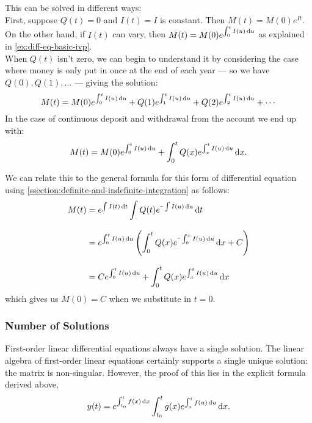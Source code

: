 \documentclass[../MathsNotesBase.tex]{subfiles}
\begin{document}
{\begin{exe}
{				This can be solved in different ways:\\
				
				First, suppose $Q(t)=0$ and $I(t)=I$ is constant. Then ${ M(t)=M(0) e^{I t} }$.\\
				
				On the other hand, if $I(t)$ can vary, then ${ M(t) = M(0) e^{\int_{0}^{t} I(u) \dif u} }$ as explained in \ref{ex:diff-eq-basic-ivp}.\\
				
				When $Q(t)$ isn't zero, we can begin to understand it by considering the case where money is only put in once at the end of each year --- so we have ${ Q(0), Q(1), \dots }$ --- giving the solution:
				\[ M(t) = M(0) e^{\int_{0}^{t} I(u) \dif u} + Q(1) e^{\int_{1}^{t} I(u) \dif u} + Q(2) e^{\int_{2}^{t} I(u) \dif u} + \cdots \]
				In the case of continuous deposit and withdrawal from the account we end up with:
				\[ M(t) = M(0) e^{\int_{0}^{t} I(u) \dif u} + \int_0^t Q(x) e^{\int_x^t I(u) \dif u} \dif x. \]
				
				We can relate this to the general formula for this form of differential equation using \ref{ssection:definite-and-indefinite-integration} as follows:
				\begin{align*}
					M(t) &= e^{\int I(t) \dif t} \int Q(t) e^{\uminus\int I(u) \dif u} \dif t \\[8pt]
					&= e^{\int_0^t I(u) \dif u} \left( \int_0^t Q(x) e^{\uminus\int_0^x I(u) \dif u} \dif x + C \right) \\[8pt]
					&= C e^{\int_0^t I(u) \dif u}  + \int_0^t Q(x) e^{\int_x^t I(u) \dif u} \dif x
				\end{align*}
				which gives us ${ M(0) = C }$ when we substitute in ${ t = 0 }$.
			}
		\end{exe}


		\biggerskip
		\subsubsection{Number of Solutions}
		First-order linear differential equations always have a single solution. The linear algebra of first-order linear equations certainly supports a single unique solution: the matrix is non-singular. However, the proof of this lies in the explicit formula derived above,
		\[ y(t) = e^{\int_{t_0}^t f(x) \dif x} \int_{t_0}^t g(x) e^{\int_x^t f(u) \dif u} \dif x. \]
	}



\end{document}
